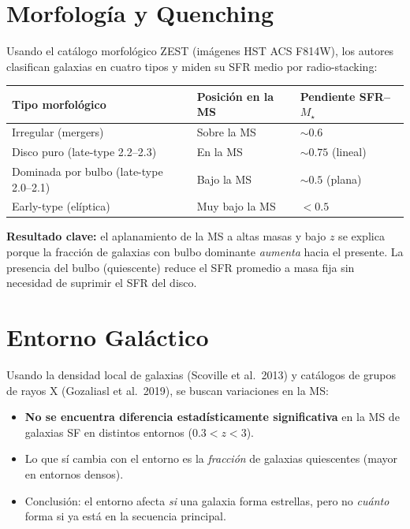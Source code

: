 \documentclass[12pt, a4paper]{article}
\begin{document}
\section{Morfología y Quenching}

Usando el catálogo morfológico ZEST (imágenes HST ACS F814W), los autores
clasifican galaxias en cuatro tipos y miden su SFR medio por radio-stacking:

\begin{center}
\begin{tabular}{lll}
\toprule
\textbf{Tipo morfológico} & \textbf{Posición en la MS} & \textbf{Pendiente SFR--$M_\star$} \\
\midrule
Irregular (mergers) & Sobre la MS & $\sim 0.6$ \\
Disco puro (late-type 2.2--2.3) & En la MS & $\sim 0.75$ (lineal) \\
Dominada por bulbo (late-type 2.0--2.1) & Bajo la MS & $\sim 0.5$ (plana) \\
Early-type (elíptica) & Muy bajo la MS & $< 0.5$ \\
\bottomrule
\end{tabular}
\end{center}

\textbf{Resultado clave:} el aplanamiento de la MS a altas masas y bajo $z$
se explica porque la fracción de galaxias con bulbo dominante \textit{aumenta}
hacia el presente. La presencia del bulbo (quiescente) reduce el SFR promedio
a masa fija sin necesidad de suprimir el SFR del disco.

\section{Entorno Galáctico}

Usando la densidad local de galaxias (Scoville et al.\ 2013) y catálogos
de grupos de rayos X (Gozaliasl et al.\ 2019), se buscan variaciones en la MS:

\begin{itemize}[leftmargin=2em]
    \item \textbf{No se encuentra diferencia estadísticamente significativa}
          en la MS de galaxias SF en distintos entornos ($0.3 < z < 3$).
    \item Lo que sí cambia con el entorno es la \textit{fracción} de galaxias
          quiescentes (mayor en entornos densos).
    \item Conclusión: el entorno afecta \textit{si} una galaxia forma estrellas,
          pero no \textit{cuánto} forma si ya está en la secuencia principal.
\end{itemize}
\end{document}
